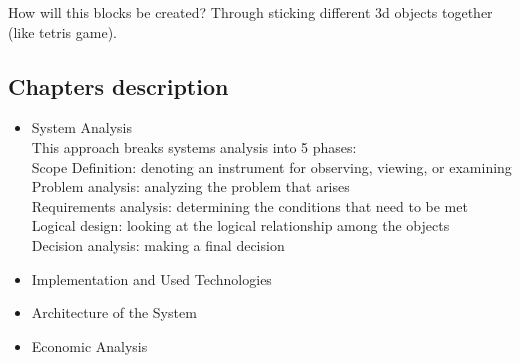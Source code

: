 How will this blocks be created? Through sticking different 3d objects together (like tetris game).

\subsection{Chapters description}
	\begin{itemize}
	\item System Analysis
	\\
	This approach breaks systems analysis into 5 \cite{sa} phases:\\
	Scope Definition: denoting an instrument for observing, viewing, or examining\\
	Problem analysis: analyzing the problem that arises\\
	Requirements analysis: determining the conditions that need to be met\\
	Logical design: looking at the logical relationship among the objects\\
	Decision analysis: making a final decision
	
	\item {Implementation and Used Technologies}
	\item {Architecture of the System}
	\item {Economic Analysis}
	\end{itemize}
\clearpage
\clearpage